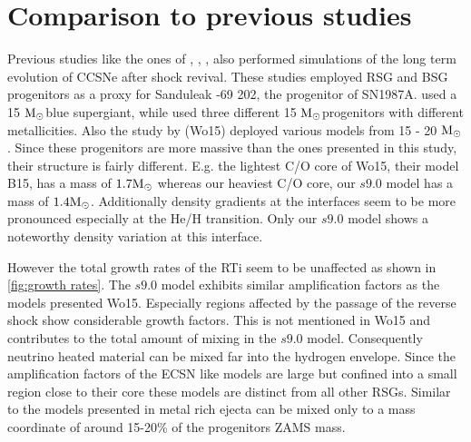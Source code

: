 \documentclass[fleqn,usenatbib]{mnras}
\newcommand{\solm}{\xspace\ensuremath{\rm{M_{\odot}}}}
\begin{document}
\section{Comparison to previous studies}
\label{sec:Comparison to previous studies}

Previous studies like the ones of \cite{Hammer2010}, \cite{Joggerst2010}, \citet{Wongwathanarat2015}, \citet{Kifonidis2005} also performed simulations of the long term evolution of CCSNe after shock revival. These studies employed RSG and BSG progenitors as a proxy for Sanduleak -69 202, the progenitor of SN1987A. \citet{Hammer2010} used a 15 \solm blue supergiant, while \citet{Joggerst2010} used three different 15 \solm progenitors with different metallicities. Also the study by
\citet{Wongwathanarat2015} (Wo15) deployed various models from 15 - 20 \solm. 
Since these progenitors are more massive than the ones presented in this study, their structure is fairly different. E.g. the lightest C/O core of Wo15, their model B15, has a mass of $1.7\solm$ whereas our heaviest C/O core, our $s9.0$ model has a mass of $1.4\solm$. Additionally density gradients at the interfaces seem to be more pronounced especially at the He/H transition. Only our $s9.0$ model shows a noteworthy density variation at this interface.

However the total growth rates of the RTi seem to be unaffected as shown in \autoref{fig:growth rates}. The $s9.0$ model exhibits similar amplification factors as the models presented Wo15. Especially regions affected by the passage of the reverse shock show considerable growth factors. This is not mentioned in Wo15 and contributes to the total amount of mixing in the $s9.0$ model. Consequently neutrino heated material can be mixed far into the hydrogen envelope. 
Since the amplification factors of the ECSN like models are large but confined into a small region close to their core these models are distinct from all other RSGs. Similar to the models presented in \citet{Joggerst2010} metal rich ejecta can be mixed only to a mass coordinate of around 15-20\% of the progenitors ZAMS mass.
\end{document}
